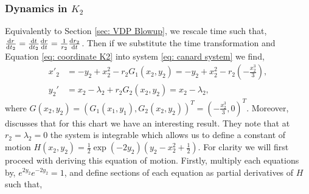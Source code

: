 \subsubsection{Dynamics in \texorpdfstring{$K_2$}{K2}}
Equivalently to Section \ref{sec: VDP Blowup}, we rescale time such that, $\od{r}{t_2}=\od{t}{t_2}\od{r}{t}=\frac{1}{r_2}\od{r_2}{t}$. Then if we substitute the time transformation and Equation  \ref{eq: coordinate K2} into system \ref{eq: canard system} we find, 
\begin{subequations}
	\begin{align}
	x'_2&=-y_2+x_2^2-r_2G_1(x_2,y_2) =-y_2+x_2^2-r_2\left(-\frac{x^3_2}{3} \right) ,\label{eq k2 x trans}\\
	y_2'&=x_2-\lambda_2+r_2G_2(x_2,y_2)= x_2-\lambda_2, %
	\label{eq: K2 y trans}
	\end{align}
\end{subequations}
where $G(x_2,y_2)=(G_1(x_1,y_1),G_2(x_2,y_2))^T=(-\frac{x^3_2}{3},0)^T$. Moreover, \citet{krupa2001} discusses that for this chart we have an interesting result. They note that at $r_2=\lambda_2=0$ the system is integrable which allows us to define a constant of motion $H(x_2,y_2)=\frac{1}{2}\exp{(-2y_2)}\left(y_2-x^2_2+\frac{1}{2}\right)$. For clarity we will first proceed with deriving this equation of motion. Firstly, multiply each equations by, $e^{2y_2}e^{-2y _2}=1$, and define sections of each equation as partial derivatives of $H$ such that, 
